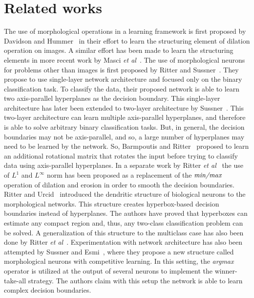 \documentclass{bmvc2k}
\def\etal{\emph{et al}\bmvaOneDot}
\begin{document}
\section{Related works}
\label{sec:rel_work}
The use of morphological operations in a learning framework is first proposed by Davidson and Hummer~\cite{davidson_morphology_1993} in their effort to learn the structuring element of dilation operation on images. A similar effort has been made to learn the structuring elements in more recent work by Masci \etal{}~\cite{masci2013learning}. The use of morphological neurons for problems other than images is first proposed by Ritter and Sussner~\cite{ritter_introduction_1996}. They propose to use single-layer network architecture and focused only on the binary classification task. To classify the data, their proposed network is able to learn two axis-parallel hyperplanes as the decision boundary. This single-layer architecture has later been extended to two-layer architecture by Sussner~\cite{sussner_morphological_1998}. This two-layer architecture can learn multiple axis-parallel hyperplanes, and therefore is able to solve arbitrary binary classification tasks. But, in general, the decision boundaries may not be axis-parallel, and so, a large number of hyperplanes may need to be learned by the network. So, Barmpoutis and Ritter~\cite{barmpoutis_orthonormal_2006} proposed to learn an additional rotational matrix that rotates the input before trying to classify data using axis-parallel hyperplanes. 
In a separate work by Ritter \etal{}~\cite{ritter_two_2014} the use of $L^1$ and $L^\infty$ norm has been proposed as a replacement of the $\emph{min/max}$ operation of dilation and erosion in order to smooth the decision boundaries. 
Ritter and Urcid~\cite{ritter_lattice_2003} introduced the dendritic structure of biological neurons to the morphological networks. This structure creates hyperbox-based decision boundaries instead of hyperplanes. The authors have proved that hyperboxes can estimate any compact region and, thus, any two-class classification problem can be solved. A generalization of this structure to the multiclass case has also been done by Ritter \etal{}~\cite{ritter_learning_2007}. Experimentation with network architecture has also been attempted by Sussner and Esmi~\cite{sussner_morphological_2011}, where they propose a new structure called morphological neurons with competitive learning. In this setting, the \emph{argmax} operator is utilized at the output of several neurons to implement the winner-take-all strategy. The authors claim with this setup the network is able to learn complex decision boundaries. 
\end{document}
